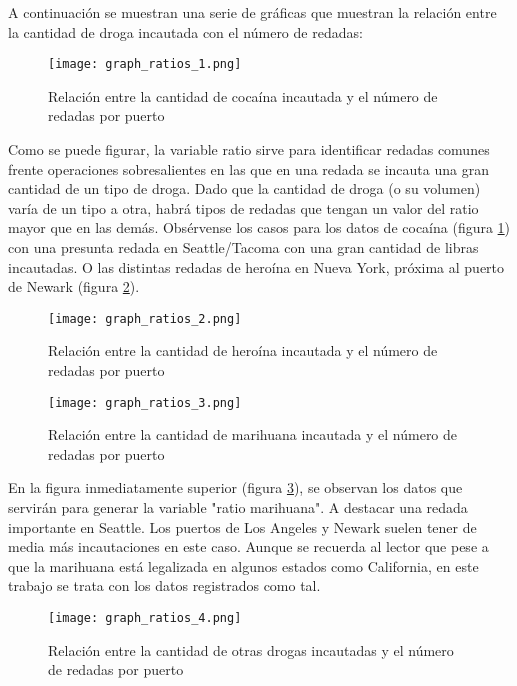 \documentclass[12pt]{article}
\begin{document}
		A continuación se muestran una serie de gráficas que muestran la relación entre la cantidad de droga incautada con el número de redadas:
		
		\begin{figure}[H]
			\caption{\label{graph_ratios_1} Relación entre la cantidad de cocaína incautada y el número de redadas por puerto}
			\centering
			\hspace*{1cm}
			\texttt{[image: graph\_ratios\_1.png]}
		\end{figure}
		
		Como se puede figurar, la variable ratio sirve para identificar redadas comunes frente operaciones sobresalientes en las que en una redada se incauta una gran cantidad de un tipo de droga. Dado que la cantidad de droga (o su volumen) varía de un tipo a otra, habrá tipos de redadas que tengan un valor del ratio mayor que en las demás. Obsérvense los casos para los datos de cocaína (figura \ref{graph_ratios_1}) con una presunta redada en Seattle/Tacoma con una gran cantidad de libras incautadas. O las distintas redadas de heroína en Nueva York, próxima al puerto de Newark (figura \ref{graph_ratios_2}).
		
		\begin{figure}[H]
			\caption{\label{graph_ratios_2} Relación entre la cantidad de heroína incautada y el número de redadas por puerto}
			\centering
			\hspace*{1cm}
			\texttt{[image: graph\_ratios\_2.png]}
		\end{figure}
		
		\begin{figure}[H]
			\caption{\label{graph_ratios_3} Relación entre la cantidad de marihuana incautada y el número de redadas por puerto}
			\centering
			\hspace*{1cm}
			\texttt{[image: graph\_ratios\_3.png]}
		\end{figure}
	
		En la figura inmediatamente superior (figura \ref{graph_ratios_3}), se observan los datos que servirán para generar la variable "ratio marihuana". A destacar una redada importante en Seattle. Los puertos de Los Angeles y Newark suelen tener de media más incautaciones en este caso. Aunque se recuerda al lector que pese a que la marihuana está legalizada en algunos estados como California, en este trabajo se trata con los datos registrados como tal.
		
		\begin{figure}[H]
			\caption{\label{graph_ratios_4} Relación entre la cantidad de otras drogas incautadas y el número de redadas por puerto}
			\centering
			\hspace*{1cm}
			\texttt{[image: graph\_ratios\_4.png]}
		\end{figure}
	
\end{document}
